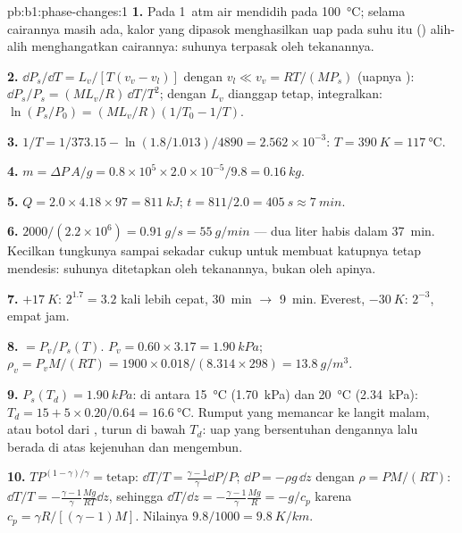 \begin{solution}{pb:b1:phase-changes:1}
\textbf{1.} Pada \qty{1}{atm} air mendidih pada \qty{100}{\degreeCelsius}; selama
cairannya masih ada, kalor yang dipasok menghasilkan uap pada suhu itu
() alih-alih menghangatkan cairannya: suhunya terpasak
oleh tekanannya.

\textbf{2.} $\dd P_s/\dd T = L_v/[T(v_v - v_l)]$ dengan $v_l \ll v_v = RT/(MP_s)$
(uapnya ): $\dd P_s/P_s = (ML_v/R)\,\dd T/T^2$; dengan $L_v$ dianggap
tetap, integralkan: $\ln(P_s/P_0) = (ML_v/R)(1/T_0 - 1/T)$.

\textbf{3.} $1/T = 1/373.15 - \ln(1.8/1.013)/4890 = 2.562 \times 10^{-3}$: $T =
\qty{390}{K} = \qty{117}{\degreeCelsius}$.

\textbf{4.} $m = \Delta P\,A/g = 0.8 \times 10^5 \times 2.0 \times 10^{-5}/9.8 =
\qty{0.16}{kg}$.

\textbf{5.} $Q = 2.0 \times 4.18 \times 97 = \qty{811}{kJ}$; $t = 811/2.0 =
\qty{405}{s} \approx \qty{7}{min}$.

\textbf{6.} $2000/(2.2 \times 10^6) = \qty{0.91}{g/s} = \qty{55}{g/min}$ --- dua
liter habis dalam \qty{37}{min}. Kecilkan tungkunya sampai sekadar cukup untuk
membuat katupnya tetap mendesis: suhunya ditetapkan oleh tekanannya, bukan oleh
apinya.

\textbf{7.} $+\qty{17}{K}$: $2^{1.7} = 3.2$ kali lebih cepat, \qty{30}{min}
$\to$ \qty{9}{min}. Everest, $-\qty{30}{K}$: $2^{-3}$, empat jam.

\textbf{8.}  $= P_v/P_s(T)$. $P_v = 0.60 \times 3.17 =
\qty{1.90}{kPa}$; $\rho_v = P_vM/(RT) = 1900 \times 0.018/(8.314 \times 298) =
\qty{13.8}{g/m^3}$.

\textbf{9.} $P_s(T_d) = \qty{1.90}{kPa}$: di antara \qty{15}{\degreeCelsius}
(\qty{1.70}{kPa}) dan \qty{20}{\degreeCelsius} (\qty{2.34}{kPa}): $T_d = 15 + 5 \times 0.20/0.64
= \qty{16.6}{\degreeCelsius}$. Rumput yang memancar ke langit malam, atau
botol dari , turun di bawah $T_d$: uap yang bersentuhan
dengannya lalu berada di atas kejenuhan dan mengembun.

\textbf{10.} $TP^{(1-\gamma)/\gamma} = \text{tetap}$: $\dd T/T = \frac{\gamma - 1}{\gamma}
\dd P/P$; $\dd P = -\rho g\,\dd z$ dengan $\rho = PM/(RT)$: $\dd T/T = -\frac{\gamma -
1}{\gamma}\frac{Mg}{RT}\dd z$, sehingga $\dd T/\dd z = -\frac{\gamma - 1}{\gamma}\frac{Mg}{R} =
-g/c_p$ karena $c_p = \gamma R/[(\gamma - 1)M]$. Nilainya $9.8/1000 = \qty{9.8}{K/km}$.


\end{solution}
